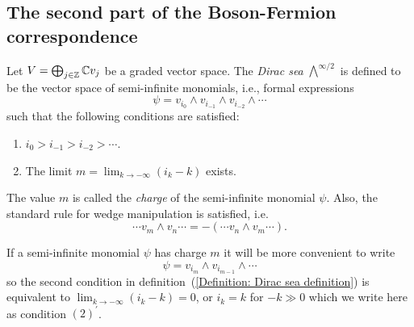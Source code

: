 \subsection{The second part of the Boson-Fermion correspondence}

\begin{dang}
    \begin{definition}\cite{kac2013bombay}\label{Definition: Dirac sea definition}
        Let $V=\bigoplus_{j\in\mathbb{Z}}\mathbb{C}v_j$ be a graded vector space. The \textit{Dirac sea} $\bigwedge^{\infty/2}$ is defined to be the vector space of semi-infinite monomials, i.e., formal expressions 
        \begin{equation}
            \psi =v_{i_0}\wedge v_{i_{-1}}\wedge v_{i_{-2}}\wedge\cdots
        \end{equation}
        such that the following conditions are satisfied:
        \begin{enumerate}
            \item[(1)] $i_0>i_{-1}>i_{-2}>\cdots$.
            \item[(2)] The limit $m=\lim_{k\to -\infty} (i_k-k)$ exists.
        \end{enumerate}
       The value $m$ is called the \textit{charge} of the semi-infinite monomial $\psi$.  Also, the standard rule for wedge manipulation is satisfied, i.e.
       \begin{equation}
           \cdots v_m\wedge v_n\cdots = -(\cdots v_n\wedge v_m\cdots).
       \end{equation}
    \end{definition}
\end{dang}
If a semi-infinite monomial $\psi$ has charge $m$ it will be more convenient to write
\begin{equation}
    \psi=v_{i_m}\wedge v_{i_{m-1}}\wedge\cdots
\end{equation}
so the second condition in definition~(\ref{Definition: Dirac sea definition}) is equivalent to $\lim_{k\to -\infty} (i_k-k)=0$, or $i_k=k$ for $-k\gg 0 $ which we write here as condition $(2)^\prime$.\par

